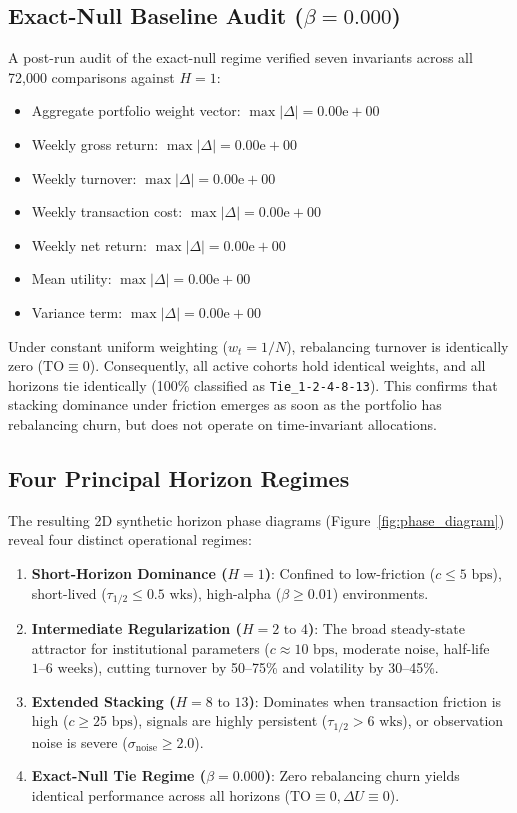 \documentclass[11pt,a4paper]{article}
\theoremstyle{definition}
\begin{document}
\subsection{Exact-Null Baseline Audit (\texorpdfstring{$\beta = 0.000$}{beta = 0.000})}
A post-run audit of the exact-null regime verified seven invariants across all 72,000 comparisons against $H=1$:
\begin{itemize}
    \item Aggregate portfolio weight vector: $\max |\Delta| = 0.00\text{e}+00$
    \item Weekly gross return: $\max |\Delta| = 0.00\text{e}+00$
    \item Weekly turnover: $\max |\Delta| = 0.00\text{e}+00$
    \item Weekly transaction cost: $\max |\Delta| = 0.00\text{e}+00$
    \item Weekly net return: $\max |\Delta| = 0.00\text{e}+00$
    \item Mean utility: $\max |\Delta| = 0.00\text{e}+00$
    \item Variance term: $\max |\Delta| = 0.00\text{e}+00$
\end{itemize}
Under constant uniform weighting ($w_t = 1/N$), rebalancing turnover is identically zero ($\text{TO} \equiv 0$). Consequently, all active cohorts hold identical weights, and all horizons tie identically (100\% classified as \texttt{Tie\_1-2-4-8-13}). This confirms that stacking dominance under friction emerges as soon as the portfolio has rebalancing churn, but does not operate on time-invariant allocations.

\subsection{Four Principal Horizon Regimes}
The resulting 2D synthetic horizon phase diagrams (Figure~\ref{fig:phase_diagram}) reveal four distinct operational regimes:
\begin{enumerate}
    \item \textbf{Short-Horizon Dominance ($H=1$)}: Confined to low-friction ($c \le 5\text{ bps}$), short-lived ($\tau_{1/2} \le 0.5\text{ wks}$), high-alpha ($\beta \ge 0.01$) environments.
    \item \textbf{Intermediate Regularization ($H=2\text{ to }4$)}: The broad steady-state attractor for institutional parameters ($c \approx 10\text{ bps}$, moderate noise, half-life $1\text{--}6\text{ weeks}$), cutting turnover by 50--75\% and volatility by 30--45\%.
    \item \textbf{Extended Stacking ($H=8\text{ to }13$)}: Dominates when transaction friction is high ($c \ge 25\text{ bps}$), signals are highly persistent ($\tau_{1/2} > 6\text{ wks}$), or observation noise is severe ($\sigma_{\text{noise}} \ge 2.0$).
    \item \textbf{Exact-Null Tie Regime ($\beta = 0.000$)}: Zero rebalancing churn yields identical performance across all horizons ($\text{TO} \equiv 0, \Delta U \equiv 0$).
\end{enumerate}
\end{document}
